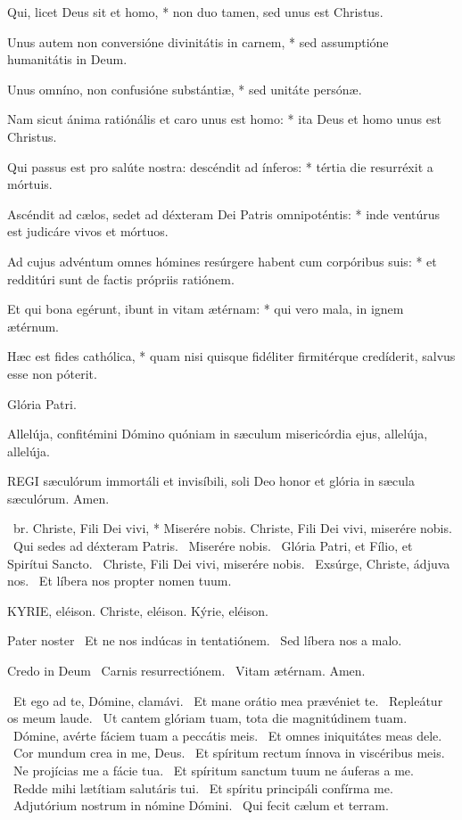 Qui, licet Deus sit et homo, * non duo tamen, sed unus est Christus.

Unus autem non conversióne divinitátis in carnem, * sed assumptióne humanitátis in Deum.

Unus omníno, non confusióne substántiæ, * sed unitáte persónæ.

Nam sicut ánima ratiónális et caro unus est homo: * ita Deus et homo unus est Christus.

Qui passus est pro salúte nostra: descéndit ad ínferos: * tértia die resurréxit a mórtuis.

Ascéndit ad cælos, sedet ad déxteram Dei Patris omnipoténtis: * inde ventúrus est judicáre vivos et mórtuos.

Ad cujus advéntum omnes hómines resúrgere habent cum corpóribus suis: * et redditúri sunt de factis própriis ratiónem.

Et qui bona egérunt, ibunt in vitam ætérnam: * qui vero mala, in ignem ætérnum.

Hæc est fides cathólica, * quam nisi quisque fidéliter firmitérque credíderit, salvus esse non póterit.

Glória Patri.


 Allelúja, confitémini Dómino quóniam in sæculum misericórdia ejus, allelúja, allelúja.


\lettrine[lines=2]{R}{EGI} sæculórum immortáli et invisíbili, soli Deo honor et glória in sæcula sæculórum. Amen.

\R\ br. Christe, Fili Dei vivi, * Miserére nobis.  Christe, Fili Dei vivi, miserére nobis. \V\ Qui sedes ad déxteram Patris. \R\ Miserére nobis. \V\ Glória Patri, et Fílio, et Spirítui Sancto. \R\ Christe, Fili Dei vivi, miserére nobis. \V\ Exsúrge, Christe, ádjuva nos. \R\ Et líbera nos propter nomen tuum.


KYRIE, eléison. Christe, eléison. Kýrie, eléison.

Pater noster  \V\ Et ne nos indúcas in tentatiónem. \R\ Sed líbera nos a malo.

Credo in Deum  \V\ Carnis resurrectiónem. \R\ Vitam ætérnam. Amen.

\V\ Et ego ad te, Dómine, clamávi. \R\ Et mane orátio mea prævéniet te. \V\ Repleátur os meum laude. \R\ Ut cantem glóriam tuam, tota die magnitúdinem tuam. \V\ Dómine, avérte fáciem tuam a peccátis meis. \R\ Et omnes iniquitátes meas dele. \V\ Cor mundum crea in me, Deus. \R\ Et spíritum rectum ínnova in viscéribus meis. \V\ Ne projícias me a fácie tua. \R\ Et spíritum sanctum tuum ne áuferas a me. \V\ Redde mihi lætítiam salutáris tui. \R\ Et spíritu principáli confírma me. \V\ Adjutórium nostrum in nómine Dómini. \R\ Qui fecit cælum et terram.

